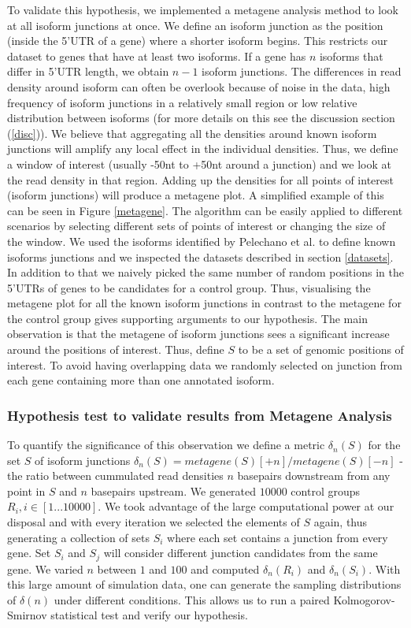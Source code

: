 \documentclass[12pt]{article}
\begin{document}
To validate this hypothesis, we implemented a metagene analysis method to look at all isoform junctions at once. We define an isoform junction as the position (inside the 5'UTR of a gene) where a shorter isoform begins. This restricts our dataset to genes that have at least two isoforms. If a gene has $n$ isoforms that differ in 5'UTR length, we obtain $n - 1$ isoform junctions. The differences in read density around isoform can often be overlook because of noise in the data, high frequency of isoform junctions in a relatively small region or low relative distribution between isoforms (for more details on this see the discussion section (\ref{disc})). We believe that aggregating all the densities around known isoform junctions will amplify any local effect in the individual densities. Thus, we define a window of interest (usually -50nt to +50nt around a junction) and we look at the read density in that region. Adding up the densities for all points of interest (isoform junctions) will produce a metagene plot. A simplified example of this can be seen in Figure \ref{metagene}. The algorithm can be easily applied to different scenarios by selecting different sets of points of interest or changing the size of the window. 
We used the isoforms identified by Pelechano et al. \cite{Pelechano2013} to define known isoforms junctions and we inspected the datasets described in section \ref{datasets}. In addition to that we naively picked the same number of random positions in the 5'UTRs of genes to be candidates for a control group. Thus, visualising the metagene plot for all the known isoform junctions in contrast to the metagene for the control group gives supporting arguments to our hypothesis. The main observation is that the metagene of isoform junctions sees a significant increase around the positions of interest. 
Thus, define $S$ to be a set of genomic positions of interest. To avoid having overlapping data we randomly selected on junction from each gene containing more than one annotated isoform.  
\subsubsection{Hypothesis test to validate results from Metagene Analysis} \label{ks_test}
To quantify the significance of this observation we define a metric $\delta_n(S)$ for the set $S$ of isoform junctions $\delta_n(S) = metagene(S)[+n] / metagene(S)[-n]$ - the ratio between cummulated read densities $n$ basepairs downstream from any point in $S$ and $n$ basepairs upstream. We generated $10000$ control groups $R_i, i \in [1...10000]$. We took advantage of the large computational power at our disposal and with every iteration we selected the elements of $S$ again, thus generating a collection of sets $S_i$ where each set contains a junction from every gene. Set $S_i$ and $S_j$ will consider different junction candidates from the same gene. We varied $n$ between $1$ and $100$ and computed $\delta_n(R_i)$ and $\delta_n(S_i)$. With this large amount of simulation data, one can generate the sampling distributions of $\delta(n)$ under different conditions. This allows us to run a paired Kolmogorov-Smirnov \cite{Massey1951} statistical test and verify our hypothesis. 
\end{document}
